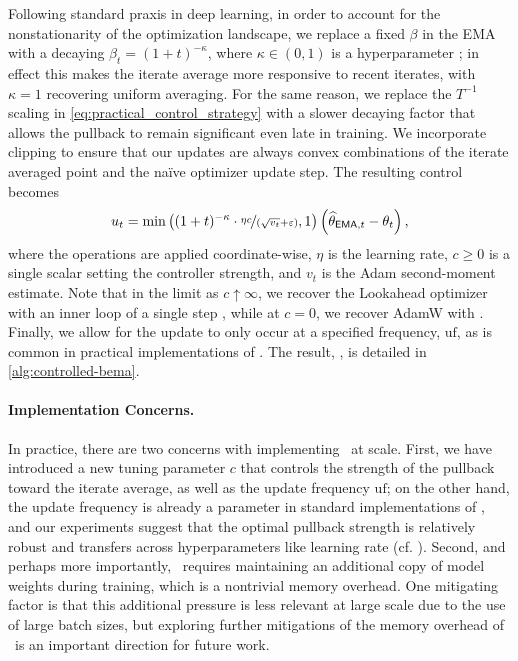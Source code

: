 Following standard praxis in deep learning, in order to account for the nonstationarity of the optimization landscape, we replace a fixed $\beta$ in the EMA with a decaying $\beta_t = (1+t)^{-\kappa}$, where $\kappa \in (0, 1)$ is a hyperparameter \citep{busbridge2023scale,block2025ema,block2024butterfly,kaddour2022stop}; in effect this makes the iterate average more responsive to recent iterates, with $\kappa = 1$ recovering uniform averaging.  For the same reason, we replace the $T^{-1}$ scaling in \eqref{eq:practical_control_strategy} with a slower decaying factor that allows the pullback to remain significant even late in training.  We incorporate clipping to ensure that our updates are always convex combinations of the iterate averaged point and the na{\"i}ve optimizer update step. The resulting control becomes
\begin{align}\label{eq:practical_control_strategy_empirical}
    u_{t} = \min\left( (1 + t)^{- \kappa} \cdot \nicefrac{\eta c}{\left( \sqrt{v_{t}} + \epsilon \right)}, 1 \right)\left( \thetema[t] - \theta_t \right),
\end{align}
where the operations are applied coordinate-wise, $\eta$ is the learning rate, $c \geq 0$ is a single scalar setting the controller strength, and $v_t$ is the Adam second-moment estimate.  Note that in the limit as $c \uparrow \infty$, we recover the Lookahead optimizer with an inner loop of a single step \citep{zhang2019lookahead}, while at $c=  0$, we recover AdamW with \ema.  Finally, we allow for the update to only occur at a specified frequency, $\mathrm{uf}$, as is common in practical implementations of \ema. The result, \pace, is detailed in \cref{alg:controlled-bema}.  

\paragraph{Implementation Concerns.} In practice, there are two concerns with implementing \pace\ at scale.  First, we have introduced a new tuning parameter $c$ that controls the strength of the pullback toward the iterate average, as well as the update frequency $\mathrm{uf}$; on the other hand, the update frequency is already a parameter in standard implementations of \ema, and our experiments suggest that the optimal pullback strength is relatively robust and transfers across hyperparameters like learning rate (cf. ).
Second, and perhaps more importantly, \pace\ requires maintaining an additional copy of model weights during training, which is a nontrivial memory overhead.  One mitigating factor is that this additional pressure is less relevant at large scale due to the use of large batch sizes, but exploring further mitigations of the memory overhead of \pace\ is an important direction for future work.





